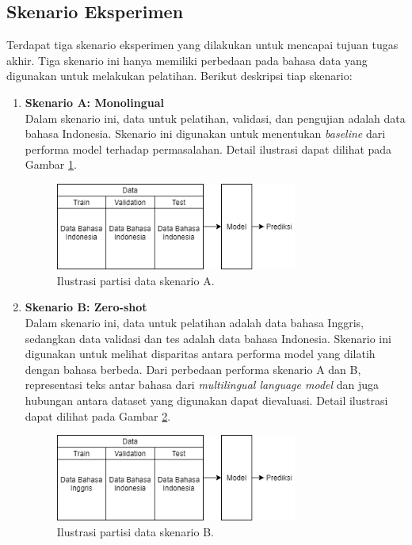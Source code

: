 	\subsection{Skenario Eksperimen}
	Terdapat tiga skenario eksperimen yang dilakukan untuk mencapai tujuan tugas akhir. Tiga skenario ini hanya memiliki perbedaan pada bahasa data yang digunakan untuk melakukan pelatihan. Berikut deskripsi tiap skenario:
	\begin{enumerate}
		\item \textbf{Skenario A: Monolingual}\\
		Dalam skenario ini, data untuk pelatihan, validasi, dan pengujian adalah data bahasa Indonesia. Skenario ini digunakan untuk menentukan \textit{baseline} dari performa model terhadap permasalahan. Detail ilustrasi dapat dilihat pada Gambar \ref{fig:data_tipe_a}.
		\begin{figure}[h]
		    \centering
		    \includegraphics[width=0.75\textwidth]{resources/Data-tipe-A.png}
		    \caption{Ilustrasi partisi data skenario A.}
		    \label{fig:data_tipe_a}
		\end{figure}

		\item \textbf{Skenario B: Zero-shot}\\
		Dalam skenario ini, data untuk pelatihan adalah data bahasa Inggris, sedangkan data validasi dan tes adalah data bahasa Indonesia. Skenario ini digunakan untuk melihat disparitas antara performa model yang dilatih dengan bahasa berbeda. Dari perbedaan performa skenario A dan B, representasi teks antar bahasa dari \textit{multilingual language model} dan juga hubungan antara dataset yang digunakan dapat dievaluasi. Detail ilustrasi dapat dilihat pada Gambar \ref{fig:data_tipe_b}.
		\begin{figure}[h]
		    \centering
		    \includegraphics[width=0.75\textwidth]{resources/Data-tipe-B.png}
		    \caption{Ilustrasi partisi data skenario B.}
		    \label{fig:data_tipe_b}
		\end{figure}


\end{enumerate}
